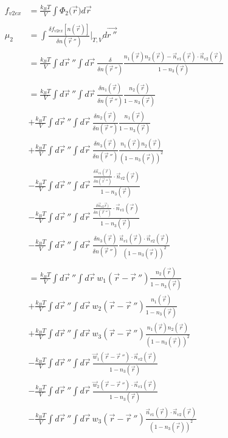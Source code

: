 \documentclass[double,12pt]{beavtex}
\begin{document}
\begin{align}
    f_{v2ex} &= \frac{k_BT}{V}\int \Phi_2(\vec{r}{) d}\vec{r} \\ \nonumber\\
    \mu_2 &= \int \frac{\delta f_{v2ex}[n(\vec r)]}{\delta n(\vec r~'')}
          \bigg|_{T,V} d\vec{r~''} \\
%
          &= \frac{k_BT}{V} \int d\vec r~'' \int d \vec r ~
          \frac{\delta }{\delta n(\vec r~'')}
          \frac{n_1(\vec r)n_2(\vec r)-\vec n_{v1}(\vec r)\cdot 
          \vec n_{v2}(\vec r)}{1-n_3(\vec r)}   \nonumber\\  \\        
%
          &= \frac{k_BT}{V} \int d\vec r~'' \int d \vec r ~
          \frac{\delta n_1(\vec r)}{\delta n(\vec r~'')}
          \frac{n_2(\vec r)}{1-n_3(\vec r)}   \nonumber\\
          &+\frac{k_BT}{V} \int d\vec r~'' \int d \vec r ~
          \frac{\delta n_2(\vec r)}{\delta n(\vec r~'')}
          \frac{n_1(\vec r)}{1-n_3(\vec r)}   \nonumber\\
          &+\frac{k_BT}{V} \int d\vec r~'' \int d \vec r~
          \frac{\delta n_3(\vec r)}{\delta n(\vec r~'')}
          \frac{n_1(\vec r)n_2(\vec r)}{(1-n_3(\vec r))^2}  \nonumber\\
          &-\frac{k_BT}{V} \int d\vec r~'' \int d \vec r~\frac{\frac{\delta 
          \vec n_{v1}(\vec r)}{\delta n(\vec r~'')}\cdot \vec n_{v2}(\vec r)}
          {1-n_3(\vec r)}  \nonumber\\
          &-\frac{k_BT}{V} \int d\vec r~'' \int d \vec r~\frac{\frac{\delta 
          \vec n_{v2}\vec r)}{\delta n(\vec r~'')}\cdot \vec n_{v1}(\vec r)}
          {1-n_3(\vec r)}  \nonumber\\
          &-\frac{k_BT}{V} \int d\vec r~''\int d \vec r ~
          \frac{\delta n_3(\vec r)}{\delta n(\vec r~'')}
           \frac{\vec n_{v1}(\vec r)\cdot \vec n_{v2}(\vec r)}
           {(1-n_3(\vec r))^2} \\ \nonumber\\
%
          &= \frac{k_BT}{V} \int d\vec r~'' \int d \vec r ~w_1(\vec r-\vec r~'')
          \frac{n_2(\vec r)}{1-n_3(\vec r)}   \nonumber\\
          &+\frac{k_BT}{V} \int d\vec r~'' \int d \vec r ~w_2(\vec r-\vec r~'')
          \frac{n_1(\vec r)}{1-n_3(\vec r)}   \nonumber\\
          &+\frac{k_BT}{V} \int d\vec r~'' \int d \vec r~w_3(\vec r - \vec r~'') 
          \frac{n_1(\vec r)n_2(\vec r)}{(1-n_3(\vec r))^2}  \nonumber\\
          &-\frac{k_BT}{V} \int d\vec r~'' \int d \vec r~\frac{\vec w_1(\vec r 
          - \vec r~'')\cdot \vec n_{v2}(\vec r)}{1-n_3(\vec r)}  \nonumber\\
          &-\frac{k_BT}{V} \int d\vec r~'' \int d \vec r~\frac{\vec w_2(\vec r 
          - \vec r~'')\cdot \vec n_{v1}(\vec r)}{1-n_3(\vec r)}  \nonumber\\
          &-\frac{k_BT}{V} \int d\vec r~''\int d \vec r ~w_3(\vec r - \vec r~'')
           \frac{\vec n_{v1}(\vec r)\cdot \vec n_{v2}(\vec r)}
           {(1-n_3(\vec r))^2} 
\end{align}
\end{document}
